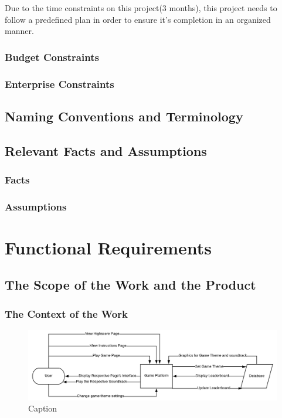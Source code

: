 \documentclass{article}
\begin{document}
Due to the time constraints on this project(3 months), this project needs to follow a predefined plan in order to ensure it's completion in an organized manner.
\subsubsection{Budget Constraints}
\subsubsection{Enterprise Constraints}
\subsection{Naming Conventions and Terminology}
\subsection{Relevant Facts and Assumptions}
\subsubsection{Facts}
\subsubsection{Assumptions}



\section{Functional Requirements}

\subsection{The Scope of the Work and the Product}

\subsubsection{The Context of the Work}
\begin{figure}
    \centering
    \includegraphics{context_diagram.png}
    \caption{Caption}
\end{figure}
\end{document}

